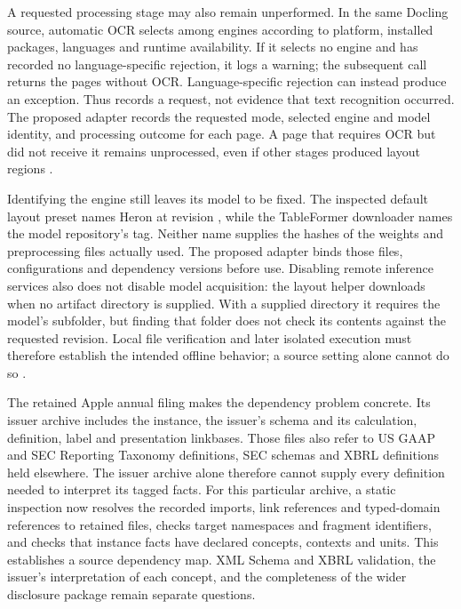 A requested processing stage may also remain unperformed. In the same Docling
source, automatic OCR selects among engines according to platform, installed
packages, languages and runtime availability. If it selects no engine and has
recorded no language-specific rejection, it logs a warning; the subsequent call
returns the pages without OCR. Language-specific rejection can instead produce
an exception. Thus  records a request, not evidence that text
recognition occurred. The proposed adapter records the requested mode, selected
engine and model identity, and processing outcome for each page. A page that
requires OCR but did not receive it remains unprocessed, even if other stages
produced layout regions \citep{doclingpinned2026}.

Identifying the engine still leaves its model to be fixed. The inspected default
layout preset names Heron at revision , while the TableFormer
downloader names the model repository's  tag. Neither name supplies
the hashes of the weights and preprocessing files actually used. The proposed
adapter binds those files, configurations and dependency versions before use.
Disabling remote inference services also does not disable model acquisition:
the layout helper downloads when no artifact directory is supplied. With a
supplied directory it requires the model's subfolder, but finding that folder
does not check its contents against the requested revision. Local file
verification and later isolated execution must therefore establish the intended
offline behavior; a source setting alone cannot do so \citep{doclingpinned2026}.

The retained Apple annual filing makes the dependency problem concrete. Its
issuer archive includes the instance, the issuer's schema and its calculation,
definition, label and presentation linkbases. Those files also refer to US GAAP
and SEC Reporting Taxonomy definitions, SEC schemas and XBRL definitions held
elsewhere. The issuer archive alone therefore cannot supply every definition
needed to interpret its tagged facts. For this particular archive, a static
inspection now resolves the recorded imports, link references and typed-domain
references to retained files, checks target namespaces and fragment identifiers,
and checks that instance facts have declared concepts, contexts and units.
This establishes a source dependency map. XML Schema and XBRL validation, the
issuer's interpretation of each concept, and the completeness of the wider
disclosure package remain separate questions.

